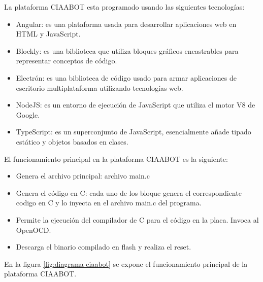 La plataforma CIAABOT esta programado usando las siguientes tecnologías:

\begin{itemize}
	\item Angular\citep{angular}: es una plataforma usada para
	desarrollar aplicaciones web en HTML y JavaScript.
	\item Blockly\citep{blockly}: es una biblioteca que utiliza bloques gráficos encastrables para representar
    conceptos de código.
	\item Electrón\citep{electron}: es una biblioteca de código usado para armar aplicaciones de escritorio multiplataforma	utilizando tecnologías web.
	\item NodeJS\citep{nodejs}: es un entorno de ejecución de JavaScript que utiliza el motor V8 de Google.
	\item TypeScript\citep{typescript}: es un superconjunto de JavaScript, esencialmente añade tipado estático y objetos basados en clases.
\end{itemize}

El funcionamiento principal en la plataforma CIAABOT es la siguiente:

\begin{itemize}
	\item Genera el archivo principal: archivo main.c
	\item Genera el código en C: cada uno de los bloque genera el correspondiente codigo en C y lo inyecta en el archivo main.c del programa.
	\item Permite la ejecución del compilador de C para el código en la placa.
	Invoca al OpenOCD.
	\item Descarga el binario compilado en flash y realiza el reset.
\end{itemize}

En la figura \ref{fig:diagrama-ciaabot} se expone el funcionamiento principal de la plataforma CIAABOT.

